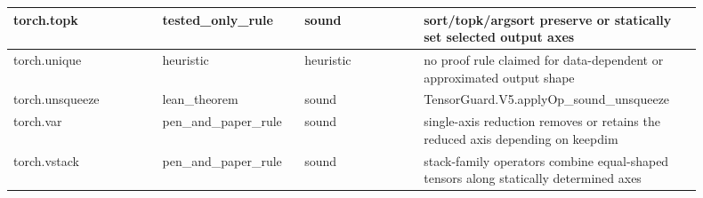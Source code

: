 \documentclass[10pt]{article}
\begin{document}
\begin{longtable}{|p{0.20\linewidth}|p{0.18\linewidth}|p{0.16\linewidth}|p{0.36\linewidth}|}
\hline
torch.topk & tested\_only\_rule & sound & sort/topk/argsort preserve or statically set selected output axes \\
\hline
torch.unique & heuristic & heuristic & no proof rule claimed for data-dependent or approximated output shape \\
\hline
torch.unsqueeze & lean\_theorem & sound & TensorGuard.V5.applyOp\_sound\_unsqueeze \\
\hline
torch.var & pen\_and\_paper\_rule & sound & single-axis reduction removes or retains the reduced axis depending on keepdim \\
\hline
torch.vstack & pen\_and\_paper\_rule & sound & stack-family operators combine equal-shaped tensors along statically determined axes \\
\hline
\end{longtable}
\end{document}
